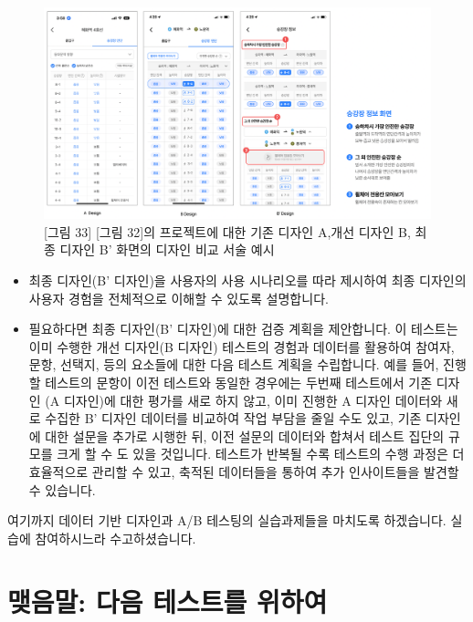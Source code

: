 \documentclass[
  letterpaper,
]{book}
\providecommand{\tightlist}{%
  \setlength{\itemsep}{0pt}\setlength{\parskip}{0pt}}\usepackage{longtable,booktabs,array}
\begin{document}
\begin{figure}[H]

{\centering \includegraphics{img/fig33.png}

}

\caption{{[}그림 33{]} {[}그림 32{]}의 프로젝트에 대한 기존 디자인
A,개선 디자인 B, 최종 디자인 B' 화면의 디자인 비교 서술 예시}

\end{figure}%

\begin{itemize}
\tightlist
\item
  최종 디자인(B' 디자인)을 사용자의 사용 시나리오를 따라 제시하여 최종
  디자인의 사용자 경험을 전체적으로 이해할 수 있도록 설명합니다.
\item
  필요하다면 최종 디자인(B' 디자인)에 대한 검증 계획을 제안합니다. 이
  테스트는 이미 수행한 개선 디자인(B 디자인) 테스트의 경험과 데이터를
  활용하여 참여자, 문항, 선택지, 등의 요소들에 대한 다음 테스트 계획을
  수립합니다. 예를 들어, 진행할 테스트의 문항이 이전 테스트와 동일한
  경우에는 두번째 테스트에서 기존 디자인 (A 디자인)에 대한 평가를 새로
  하지 않고, 이미 진행한 A 디자인 데이터와 새로 수집한 B' 디자인
  데이터를 비교하여 작업 부담을 줄일 수도 있고, 기존 디자인에 대한
  설문을 추가로 시행한 뒤, 이전 설문의 데이터와 합쳐서 테스트 집단의
  규모를 크게 할 수 도 있을 것입니다. 테스트가 반복될 수록 테스트의 수행
  과정은 더 효율적으로 관리할 수 있고, 축적된 데이터들을 통하여 추가
  인사이트들을 발견할 수 있습니다.
\end{itemize}

여기까지 데이터 기반 디자인과 A/B 테스팅의 실습과제들을 마치도록
하겠습니다. 실습에 참여하시느라 수고하셨습니다.


\chapter{맺음말: 다음 테스트를
위하여}\label{uxb9fauxc74cuxb9d0-uxb2e4uxc74c-uxd14cuxc2a4uxd2b8uxb97c-uxc704uxd558uxc5ec}
\end{document}
